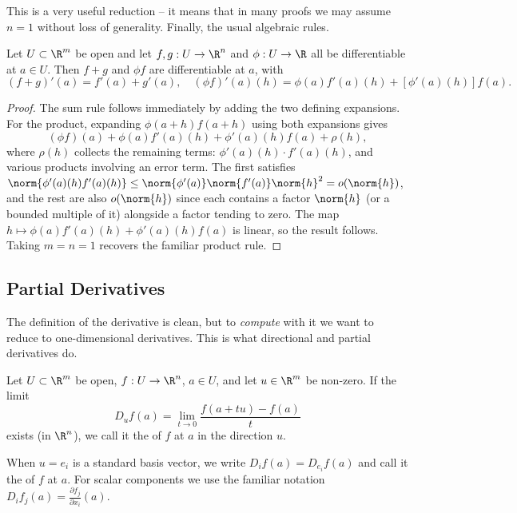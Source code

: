 This is a very useful reduction -- it means that in many proofs we may assume $n = 1$ without loss of generality. Finally, the usual algebraic rules.

\begin{proposition}
    Let $U \subset \R^m$ be open and let $f, g: U \rightarrow \R^n$ and $\phi: U \rightarrow \R$ all be differentiable at $a \in U$. Then $f + g$ and $\phi f$ are differentiable at $a$, with
    $$
    (f + g)'(a) = f'(a) + g'(a), \quad (\phi f)'(a)(h) = \phi(a) f'(a)(h) + \left[\phi'(a)(h)\right] f(a).
    $$
\end{proposition}
\begin{proof}
    The sum rule follows immediately by adding the two defining expansions. For the product, expanding $\phi(a + h)f(a + h)$ using both expansions gives
    $$
    (\phi f)(a) + \phi(a)f'(a)(h) + \phi'(a)(h)f(a) + \rho(h),
    $$
    where $\rho(h)$ collects the remaining terms: $\phi'(a)(h) \cdot f'(a)(h)$, and various products involving an error term. The first satisfies $\norm{\phi'(a)(h)f'(a)(h)} \leq \norm{\phi'(a)}\norm{f'(a)}\norm{h}^2 = o(\norm{h})$, and the rest are also $o(\norm{h})$ since each contains a factor $\norm{h}$ (or a bounded multiple of it) alongside a factor tending to zero. The map $h \mapsto \phi(a)f'(a)(h) + \phi'(a)(h)f(a)$ is linear, so the result follows. Taking $m = n = 1$ recovers the familiar product rule.
\end{proof}

\subsection{Partial Derivatives}

The definition of the derivative is clean, but to \emph{compute} with it we want to reduce to one-dimensional derivatives. This is what directional and partial derivatives do.

\begin{definition}
    Let $U \subset \R^m$ be open, $f: U \rightarrow \R^n$, $a \in U$, and let $u \in \R^m$ be non-zero. If the limit
    $$
    D_u f(a) = \lim_{t \to 0} \frac{f(a + tu) - f(a)}{t}
    $$
    exists (in $\R^n$), we call it the  of $f$ at $a$ in the direction $u$.

    When $u = e_i$ is a standard basis vector, we write $D_i f(a) = D_{e_i} f(a)$ and call it the  of $f$ at $a$. For scalar components we use the familiar notation $D_i f_j(a) = \frac{\partial f_j}{\partial x_i}(a)$.
\end{definition}

